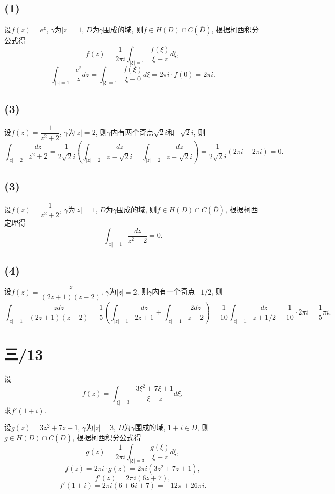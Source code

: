 \documentclass[11pt,a4paper]{article}
\begin{document}
\subsection*{(1)}
设$f(z)=e^z$, $\gamma$为$|z|=1$, $D$为$\gamma$围成的域, 则$f\in H(D)\cap C(\overline{D})$, 根据柯西积分公式得
$$f(z)=\frac{1}{2\pi i}\int_{|\xi|=1}\frac{f(\xi)}{\xi-z}d\xi,$$
$$\int_{|z|=1}\frac{e^z}{z}dz=\int_{|\xi|=1}\frac{f(\xi)}{\xi-0}d\xi=2\pi i\cdot f(0)=2\pi i.$$

\subsection*{(3)}
设$f(z)=\dfrac{1}{z^2+2}$, $\gamma$为$|z|=2$, 则$\gamma$内有两个奇点$\sqrt{2}i$和$-\sqrt{2}i$, 则
$$\int_{|z|=2}\frac{dz}{z^2+2}=\frac{1}{2\sqrt{2}i}\left(\int_{|z|=2}\frac{dz}{z-\sqrt{2}i}-\int_{|z|=2}\frac{dz}{z+\sqrt{2}i}\right)=\frac{1}{2\sqrt{2}i}(2\pi i-2\pi i)=0.$$

\subsection*{(3)}
设$f(z)=\dfrac{1}{z^2+2}$, $\gamma$为$|z|=1$, $D$为$\gamma$围成的域, 则$f\in H(D)\cap C(\overline{D})$, 根据柯西定理得
$$\int_{|z|=1}\frac{dz}{z^2+2}=0.$$

\subsection*{(4)}
设$f(z)=\dfrac{z}{(2z+1)(z-2)}$, $\gamma$为$|z|=2$, 则$\gamma$内有一个奇点$-1/2$, 则
$$\int_{|z|=1}\frac{zdz}{(2z+1)(z-2)}=\frac{1}{5}\left(\int_{|z|=1}\frac{dz}{2z+1}+\int_{|z|=1}\frac{2dz}{z-2}\right)=\frac{1}{10}\int_{|z|=1}\frac{dz}{z+1/2}=\frac{1}{10}\cdot2\pi i=\frac{1}{5}\pi i.$$

\section{三/13}
\begin{problem}
设$$f(z)=\int_{|\xi|=3}\frac{3\xi^2+7\xi+1}{\xi-z}d\xi,$$
求$f'(1+i)$.
\end{problem}

设$g(z)=3z^2+7z+1$, $\gamma$为$|z|=3$, $D$为$\gamma$围成的域, $1+i\in D$, 则$g\in H(D)\cap C(\overline{D})$, 根据柯西积分公式得
$$g(z)=\frac{1}{2\pi i}\int_{|\xi|=3}\frac{g(\xi)}{\xi-z}d\xi,$$
$$f(z)=2\pi i\cdot g(z)=2\pi i(3z^2+7z+1),$$
$$f'(z)=2\pi i(6z+7),$$
$$f'(1+i)=2\pi i(6+6i+7)=-12\pi+26\pi i.$$
\end{document}
